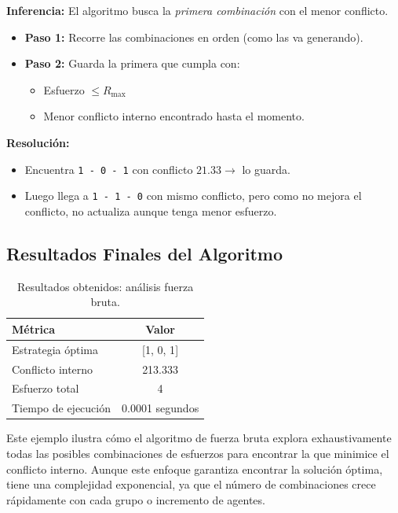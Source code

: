 \documentclass[11pt,letter]{article}
\begin{document}
\textbf{Inferencia:} El algoritmo busca la \textit{primera combinación} con el menor conflicto.

\begin{itemize}
    \item \textbf{Paso 1:} Recorre las combinaciones en orden (como las va generando).
    \item \textbf{Paso 2:} Guarda la primera que cumpla con:
    \begin{itemize}
        \item Esfuerzo $\leq R_{\text{max}}$
        \item Menor conflicto interno encontrado hasta el momento.
    \end{itemize}
\end{itemize}

\vspace{0.5em}

\textbf{Resolución:}
\begin{itemize}
    \item Encuentra \texttt{1 - 0 - 1} con conflicto $21.33 \rightarrow$ lo guarda. 
    \item Luego llega a \texttt{1 - 1 - 0} con mismo conflicto, pero como no mejora el conflicto, no actualiza aunque tenga menor esfuerzo.
\end{itemize}


\subsection*{Resultados Finales del Algoritmo}

\begin{table}[H]
\centering
\begin{tabular}{|l|c|}
\hline
\rowcolor[HTML]{EFEFEF}
\textbf{Métrica} & \textbf{Valor} \\
\hline
Estrategia óptima & {[}1, 0, 1{]} \\
\hline
Conflicto interno & 213.333 \\
\hline
Esfuerzo total & 4 \\
\hline
Tiempo de ejecución & 0.0001 segundos \\
\hline
\end{tabular}
\caption{Resultados obtenidos: análisis fuerza bruta.}
\end{table}

Este ejemplo ilustra cómo el algoritmo de fuerza bruta explora exhaustivamente todas las posibles combinaciones de esfuerzos para encontrar la que minimice el conflicto interno. Aunque este enfoque garantiza encontrar la solución óptima, tiene una complejidad exponencial, ya que el número de combinaciones crece rápidamente con cada grupo o incremento de agentes.
\end{document}
